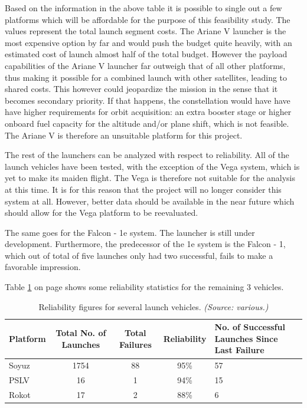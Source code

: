 Based on the information  in the above table it is possible to single out a few platforms which will be affordable for the purpose of this feasibility study. The values represent the total launch segment costs. The Ariane V launcher is the most expensive option by far and would push the budget quite heavily, with an estimated cost of launch almost half of the total budget. However the payload capabilities of the Ariane V launcher far outweigh that of all other platforms, thus making it possible for a combined launch with other satellites, leading to shared costs. This however could jeopardize the mission in the sense that it becomes secondary priority. If that happens, the constellation would have have have higher requirements for orbit acquisition: an extra booster stage or higher onboard fuel capacity for the altitude and/or plane shift, which is not feasible. The Ariane V is therefore an unsuitable platform for this project. 

The rest of the launchers can be analyzed with respect to reliability. All of the launch vehicles have been tested, with the exception of the Vega system, which is yet to make its maiden flight. The Vega is therefore not suitable for the analysis at this time. It is for this reason that the project will no longer consider this system at all.  However, better data should be available in the near future which should allow for the Vega platform to be reevaluated.

The same goes for the Falcon - 1e system. The launcher is still under development. Furthermore, the predecessor of the 1e system is the Falcon - 1, which out of total of five launches only had two successful, fails to make a favorable impression. 

Table \ref{table:LVreliability} on page \pageref{table:LVreliability} shows some reliability statistics for the remaining 3 vehicles.

\begin{table}[h]
\begin{centering}
\begin{tabular}{lcccp{5cm}}
\toprule
Platform & Total No. of Launches & Total Failures & Reliability & No. of Successful Launches Since Last Failure  \\
\hline \hline
Soyuz   & 1754  &  88 & 95\% & 57 \\
PSLV & 16 & 1 & 94\% & 15 \\
Rokot & 17& 2 & 88\% & 6 \\
\bottomrule
\end{tabular}
\caption{Reliability figures for several launch vehicles. \emph{(Source: various.)} }
\label{table:LVreliability}
\end{centering}
\end{table}

